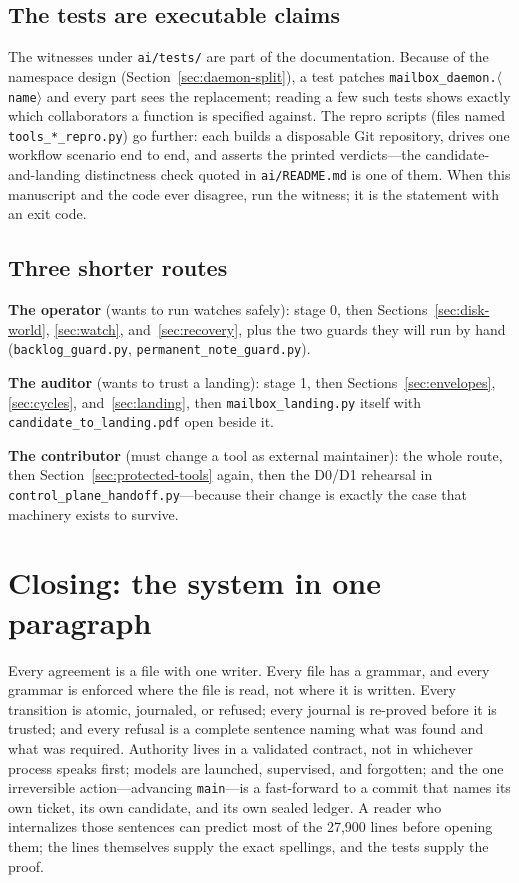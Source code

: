 \documentclass[10pt,aps,prd,twocolumn,nofootinbib]{revtex4-2}
\newcommand{\code}[1]{\texttt{#1}}
\newcommand{\file}[1]{\texttt{#1}}
\begin{document}
\subsection{The tests are executable claims}

The witnesses under \file{ai/tests/} are part of the documentation.
Because of the namespace design
(Section~\ref{sec:daemon-split}), a test patches
\code{mailbox\_daemon.$\langle$name$\rangle$} and every part sees the
replacement; reading a few such tests shows exactly which
collaborators a function is specified against.  The repro scripts
(files named \code{tools\_*\_repro.py}) go further: each builds a
disposable Git repository, drives one workflow scenario end to end,
and asserts the printed verdicts---the candidate-and-landing
distinctness check quoted in \file{ai/README.md} is one of them.  When
this manuscript and the code ever disagree, run the witness; it is the
statement with an exit code.

\subsection{Three shorter routes}

\textbf{The operator} (wants to run watches safely): stage 0, then
Sections~\ref{sec:disk-world}, \ref{sec:watch},
and~\ref{sec:recovery}, plus the two guards they will run by hand
(\file{backlog\_guard.py}, \file{permanent\_note\_guard.py}).

\textbf{The auditor} (wants to trust a landing): stage 1, then
Sections~\ref{sec:envelopes}, \ref{sec:cycles},
and~\ref{sec:landing}, then \file{mailbox\_landing.py} itself with
\file{candidate\_to\_landing.pdf} open beside it.

\textbf{The contributor} (must change a tool as external maintainer):
the whole route, then Section~\ref{sec:protected-tools} again, then
the D0/D1 rehearsal in \file{control\_plane\_handoff.py}---because
their change is exactly the case that machinery exists to survive.

\section{Closing: the system in one paragraph}

Every agreement is a file with one writer.  Every file has a grammar,
and every grammar is enforced where the file is read, not where it is
written.  Every transition is atomic, journaled, or refused; every
journal is re-proved before it is trusted; and every refusal is a
complete sentence naming what was found and what was required.
Authority lives in a validated contract, not in whichever process
speaks first; models are launched, supervised, and forgotten; and the
one irreversible action---advancing \code{main}---is a fast-forward to
a commit that names its own ticket, its own candidate, and its own
sealed ledger.  A reader who internalizes those sentences can predict
most of the 27{,}900 lines before opening them; the lines themselves
supply the exact spellings, and the tests supply the proof.
\end{document}
